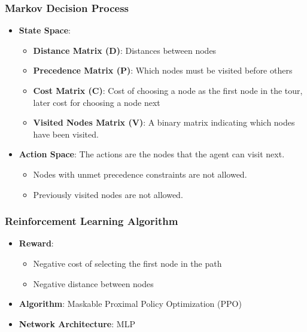 \documentclass{beamer}
\begin{document}
\begin{frame}
    \frametitle{Markov Decision Process}
    \begin{itemize}
        \item \textbf{State Space}: 
        \begin{itemize}
            \item \textbf{Distance Matrix (D)}: Distances between nodes
            \item \textbf{Precedence Matrix (P)}: Which nodes must be visited before others
            \item \textbf{Cost Matrix (C)}: Cost of choosing a node as the first node in the tour, later cost for choosing a node next
            \item \textbf{Visited Nodes Matrix (V)}: A binary matrix indicating which nodes have been visited.
        \end{itemize}
        \item \textbf{Action Space}: The actions are the nodes that the agent can visit next.
        \begin{itemize}
            \item Nodes with unmet precedence constraints are not allowed.
            \item Previously visited nodes are not allowed.
        \end{itemize}
        
    \end{itemize}
\end{frame}

\begin{frame}
    \frametitle{Reinforcement Learning Algorithm}
    \begin{itemize}
        \item \textbf{Reward}:
        \begin{itemize}
        \item Negative cost of selecting the first node in the path
        \item Negative distance between nodes
        \end{itemize}
        \item \textbf{Algorithm}: Maskable Proximal Policy Optimization (PPO) \cite{schulman2017proximalpolicyoptimizationalgorithms}
        \item \textbf{Network Architecture}: MLP
    \end{itemize}
\end{frame}
\end{document}
